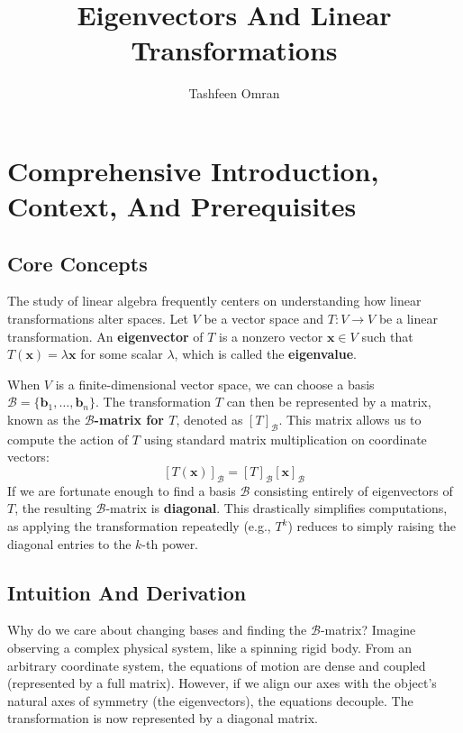 \documentclass[11pt, a4paper]{article}
\title{\textbf{Eigenvectors And Linear Transformations}}
\author{Tashfeen Omran}
\date{}
\theoremstyle{definition}
\theoremstyle{remark}
\begin{document}
\maketitle
\tableofcontents
\newpage

\section{Comprehensive Introduction, Context, And Prerequisites}

\subsection{Core Concepts}
The study of linear algebra frequently centers on understanding how linear transformations alter spaces. Let $V$ be a vector space and $T: V \to V$ be a linear transformation. An \textbf{eigenvector} of $T$ is a nonzero vector $\mathbf{x} \in V$ such that $T(\mathbf{x}) = \lambda \mathbf{x}$ for some scalar $\lambda$, which is called the \textbf{eigenvalue}. 

When $V$ is a finite-dimensional vector space, we can choose a basis $\mathcal{B} = \{\mathbf{b}_1, \dots, \mathbf{b}_n\}$. The transformation $T$ can then be represented by a matrix, known as the \textbf{$\mathcal{B}$-matrix for $T$}, denoted as $[T]_\mathcal{B}$. This matrix allows us to compute the action of $T$ using standard matrix multiplication on coordinate vectors:
\[
[T(\mathbf{x})]_\mathcal{B} = [T]_\mathcal{B} [\mathbf{x}]_\mathcal{B}
\]
If we are fortunate enough to find a basis $\mathcal{B}$ consisting entirely of eigenvectors of $T$, the resulting $\mathcal{B}$-matrix is \textbf{diagonal}. This drastically simplifies computations, as applying the transformation repeatedly (e.g., $T^k$) reduces to simply raising the diagonal entries to the $k$-th power.

\subsection{Intuition And Derivation}
Why do we care about changing bases and finding the $\mathcal{B}$-matrix? Imagine observing a complex physical system, like a spinning rigid body. From an arbitrary coordinate system, the equations of motion are dense and coupled (represented by a full matrix). However, if we align our axes with the object's natural axes of symmetry (the eigenvectors), the equations decouple. The transformation is now represented by a diagonal matrix. 
\end{document}
